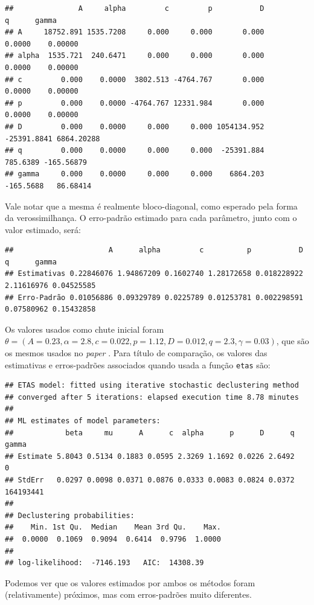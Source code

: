 \documentclass[11pt,]{article}
\begin{document}
\begin{verbatim}
##               A     alpha         c         p           D           q      gamma
## A     18752.891 1535.7208     0.000     0.000       0.000      0.0000    0.00000
## alpha  1535.721  240.6471     0.000     0.000       0.000      0.0000    0.00000
## c         0.000    0.0000  3802.513 -4764.767       0.000      0.0000    0.00000
## p         0.000    0.0000 -4764.767 12331.984       0.000      0.0000    0.00000
## D         0.000    0.0000     0.000     0.000 1054134.952 -25391.8841 6864.20288
## q         0.000    0.0000     0.000     0.000  -25391.884    785.6389 -165.56879
## gamma     0.000    0.0000     0.000     0.000    6864.203   -165.5688   86.68414
\end{verbatim}

Vale notar que a mesma é realmente bloco-diagonal, como esperado pela
forma da verossimilhança. O erro-padrão estimado para cada parâmetro,
junto com o valor estimado, será:

\begin{verbatim}
##                      A      alpha         c          p           D          q      gamma
## Estimativas 0.22846076 1.94867209 0.1602740 1.28172658 0.018228922 2.11616976 0.04525585
## Erro-Padrão 0.01056886 0.09329789 0.0225789 0.01253781 0.002298591 0.07580962 0.15432858
\end{verbatim}

Os valores usados como chute inicial foram
\(\theta = (A = 0.23, \alpha = 2.8, c = 0.022, p = 1.12, D = 0.012, q = 2.3, \gamma = 0.03)\),
que são os mesmos usados no \emph{paper} \cite{Jalilian_2019}. Para
título de comparação, os valores das estimativas e erros-padrões
associados quando usada a função \texttt{etas} são:

\begin{verbatim}
## ETAS model: fitted using iterative stochastic declustering method
## converged after 5 iterations: elapsed execution time 8.78 minutes
## 
## ML estimates of model parameters:
##            beta     mu      A      c  alpha      p      D      q     gamma
## Estimate 5.8043 0.5134 0.1883 0.0595 2.3269 1.1692 0.0226 2.6492         0
## StdErr   0.0297 0.0098 0.0371 0.0876 0.0333 0.0083 0.0824 0.0372 164193441
## 
## Declustering probabilities:
##    Min. 1st Qu.  Median    Mean 3rd Qu.    Max. 
##  0.0000  0.1069  0.9094  0.6414  0.9796  1.0000 
## 
## log-likelihood:  -7146.193   AIC:  14308.39
\end{verbatim}

Podemos ver que os valores estimados por ambos os métodos foram
(relativamente) próximos, mas com erros-padrões muito diferentes.
\end{document}
